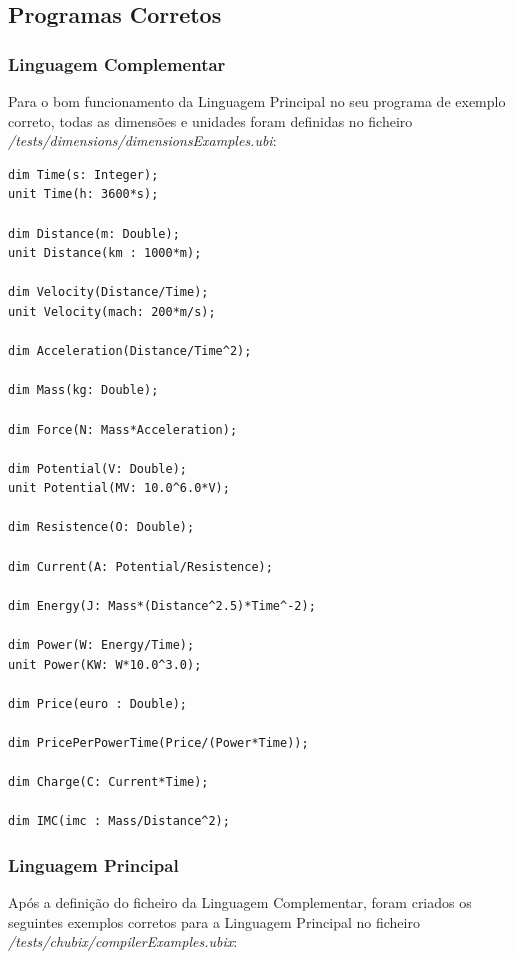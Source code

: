 \documentclass[10pt,portuguese]{article}
\begin{document}
\subsection{Programas Corretos}

\subsubsection{Linguagem Complementar}

\par Para o bom funcionamento da Linguagem Principal no seu programa de exemplo correto, todas as dimensões e unidades foram definidas no ficheiro \textit{/tests/dimensions/dimensionsExamples.ubi}:

\begin{lstlisting}
dim Time(s: Integer);
unit Time(h: 3600*s);

dim Distance(m: Double);
unit Distance(km : 1000*m);

dim Velocity(Distance/Time);
unit Velocity(mach: 200*m/s);

dim Acceleration(Distance/Time^2);

dim Mass(kg: Double);

dim Force(N: Mass*Acceleration);

dim Potential(V: Double);
unit Potential(MV: 10.0^6.0*V);

dim Resistence(O: Double);

dim Current(A: Potential/Resistence);

dim Energy(J: Mass*(Distance^2.5)*Time^-2);

dim Power(W: Energy/Time);
unit Power(KW: W*10.0^3.0);

dim Price(euro : Double);

dim PricePerPowerTime(Price/(Power*Time));

dim Charge(C: Current*Time);

dim IMC(imc : Mass/Distance^2);
\end{lstlisting}

\clearpage

\subsubsection{Linguagem Principal}

\par Após a definição do ficheiro da Linguagem Complementar, foram criados os seguintes exemplos corretos para a Linguagem Principal no ficheiro \textit{/tests/chubix/compilerExamples.ubix}:
\end{document}
